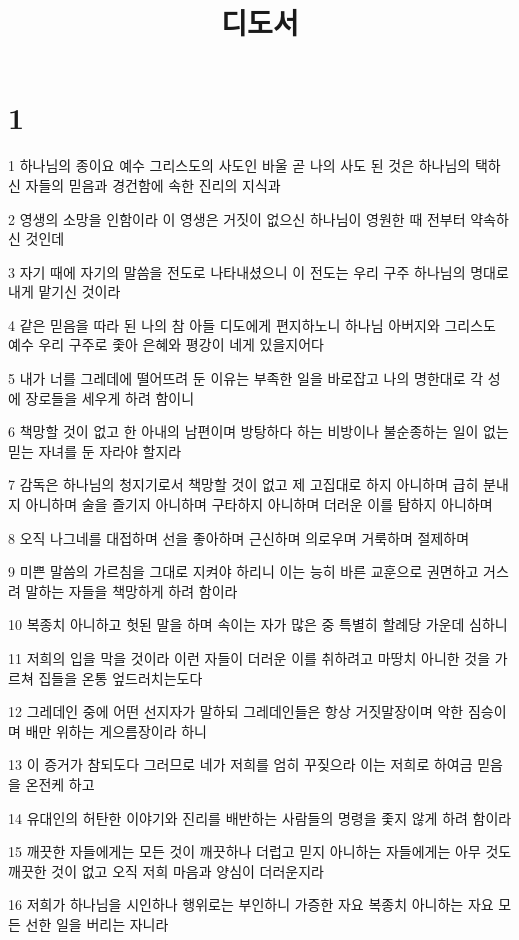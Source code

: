 

\title{디도서}


\chapter{1}

\par 1 하나님의 종이요 예수 그리스도의 사도인 바울 곧 나의 사도 된 것은 하나님의 택하신 자들의 믿음과 경건함에 속한 진리의 지식과
\par 2 영생의 소망을 인함이라 이 영생은 거짓이 없으신 하나님이 영원한 때 전부터 약속하신 것인데
\par 3 자기 때에 자기의 말씀을 전도로 나타내셨으니 이 전도는 우리 구주 하나님의 명대로 내게 맡기신 것이라
\par 4 같은 믿음을 따라 된 나의 참 아들 디도에게 편지하노니 하나님 아버지와 그리스도 예수 우리 구주로 좇아 은혜와 평강이 네게 있을지어다
\par 5 내가 너를 그레데에 떨어뜨려 둔 이유는 부족한 일을 바로잡고 나의 명한대로 각 성에 장로들을 세우게 하려 함이니
\par 6 책망할 것이 없고 한 아내의 남편이며 방탕하다 하는 비방이나 불순종하는 일이 없는 믿는 자녀를 둔 자라야 할지라
\par 7 감독은 하나님의 청지기로서 책망할 것이 없고 제 고집대로 하지 아니하며 급히 분내지 아니하며 술을 즐기지 아니하며 구타하지 아니하며 더러운 이를 탐하지 아니하며
\par 8 오직 나그네를 대접하며 선을 좋아하며 근신하며 의로우며 거룩하며 절제하며
\par 9 미쁜 말씀의 가르침을 그대로 지켜야 하리니 이는 능히 바른 교훈으로 권면하고 거스려 말하는 자들을 책망하게 하려 함이라
\par 10 복종치 아니하고 헛된 말을 하며 속이는 자가 많은 중 특별히 할례당 가운데 심하니
\par 11 저희의 입을 막을 것이라 이런 자들이 더러운 이를 취하려고 마땅치 아니한 것을 가르쳐 집들을 온통 엎드러치는도다
\par 12 그레데인 중에 어떤 선지자가 말하되 그레데인들은 항상 거짓말장이며 악한 짐승이며 배만 위하는 게으름장이라 하니
\par 13 이 증거가 참되도다 그러므로 네가 저희를 엄히 꾸짖으라 이는 저희로 하여금 믿음을 온전케 하고
\par 14 유대인의 허탄한 이야기와 진리를 배반하는 사람들의 명령을 좇지 않게 하려 함이라
\par 15 깨끗한 자들에게는 모든 것이 깨끗하나 더럽고 믿지 아니하는 자들에게는 아무 것도 깨끗한 것이 없고 오직 저희 마음과 양심이 더러운지라
\par 16 저희가 하나님을 시인하나 행위로는 부인하니 가증한 자요 복종치 아니하는 자요 모든 선한 일을 버리는 자니라

